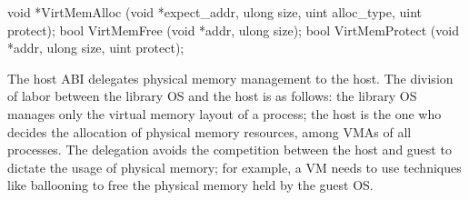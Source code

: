 \begin{paldef}
void *VirtMemAlloc   (void *expect_addr, ulong size,
                      uint alloc_type, uint protect);
bool  VirtMemFree    (void *addr, ulong size);
bool  VirtMemProtect (void *addr, ulong size,
                      uint protect);
\end{paldef}


The host ABI delegates physical memory management to the host. The division of labor between the library OS and the host is as follows:
the library OS manages only the virtual memory layout of a process;
the host is the one who decides the allocation of physical memory resources, among VMAs of all processes.
The delegation avoids the competition between the host and guest
to dictate the usage of physical memory;
for example, a VM needs to use techniques like ballooning to free the physical memory held by the guest OS.







